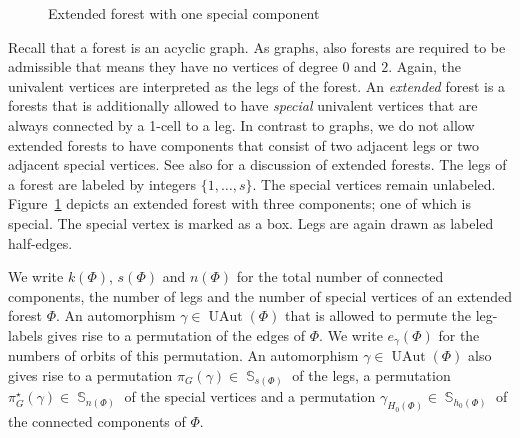 \documentclass[oneside]{amsart}
\theoremstyle{remark}
\DeclareMathOperator{\SG}{{\mathbb S}}
\newcommand{\UAut}{{\operatorname{UAut}}}
\begin{document}
\begin{figure}
    \centering
    \caption{Extended forest with one special component}
    \label{fig:extforest}
\end{figure}

Recall that a forest is an acyclic graph. As graphs, also forests are required to be admissible that means they have no vertices of degree $0$ and $2$.
Again, the univalent vertices are interpreted as the legs of the forest.
An \emph{extended} forest is a forests that is additionally allowed to have \emph{special} univalent vertices that are always connected by a 1-cell to a leg.
In contrast to graphs, we do not allow extended forests to have components that consist of 
two adjacent legs or two adjacent special vertices.
See also \cite[Section~3.7]{BV2} for a discussion of extended forests.
The legs of a forest are labeled by integers $\{1,\ldots,s\}$. The special vertices remain unlabeled.
Figure~\ref{fig:extforest} depicts an extended forest with three components; one of which is special. The special vertex is marked as a box. Legs are again drawn as labeled half-edges.

We write $k(\Phi)$, $s(\Phi)$ and $n(\Phi)$ for the 
total number of connected components, the number of legs and the number of special vertices of an extended forest $\Phi$.
An automorphism $\gamma \in \UAut(\Phi)$ that is allowed to permute the leg-labels gives rise to a permutation of the edges of $\Phi$.
We write $e_\gamma(\Phi)$ for the numbers of orbits of this permutation.
An automorphism $\gamma \in \UAut(\Phi)$ also gives rise to a permutation $\pi_G(\gamma) \in \SG_{s(\Phi)}$ of the legs, a permutation $\pi_G^\star(\gamma)\in \SG_{n(\Phi)}$ of the special vertices and a permutation $\gamma_{H_0(\Phi)}\in \SG_{h_0(\Phi)}$ of the connected components of $\Phi$.
\end{document}
